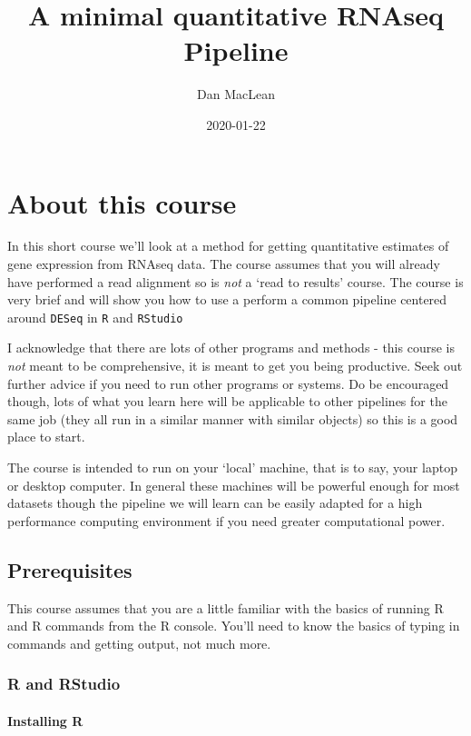 \documentclass[]{book}
\title{A minimal quantitative RNAseq Pipeline}
\author{Dan MacLean}
\date{2020-01-22}
\begin{document}
\maketitle

{
\setcounter{tocdepth}{1}
\tableofcontents
}
\hypertarget{about-this-course}{%
\chapter{About this course}\label{about-this-course}}

In this short course we'll look at a method for getting quantitative estimates of gene expression from RNAseq data. The course assumes that you will already have performed a read alignment so is \emph{not} a `read to results' course. The course is very brief and will show you how to use a perform a common pipeline centered around \texttt{DESeq} in \texttt{R} and \texttt{RStudio}

I acknowledge that there are lots of other programs and methods - this course is \emph{not} meant to be comprehensive, it is meant to get you being productive. Seek out further advice if you need to run other programs or systems. Do be encouraged though, lots of what you learn here will be applicable to other pipelines for the same job (they all run in a similar manner with similar objects) so this is a good place to start.

The course is intended to run on your `local' machine, that is to say, your laptop or desktop computer. In general these machines will be powerful enough for most datasets though the pipeline we will learn can be easily adapted for a high performance computing environment if you need greater computational power.

\hypertarget{prerequisites}{%
\section{Prerequisites}\label{prerequisites}}

This course assumes that you are a little familiar with the basics of running R and R commands from the R console. You'll need to know the basics of typing in commands and getting output, not much more.

\hypertarget{r-and-rstudio}{%
\subsection{R and RStudio}\label{r-and-rstudio}}

\hypertarget{installing-r}{%
\subsubsection{Installing R}\label{installing-r}}
\end{document}
